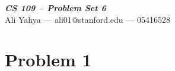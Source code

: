 \documentclass[12pt]{article}
\begin{document}

   \begin{center}
      {\textbf{
         {\textit{
            {\Large{CS 109 -- Problem Set 6}}
         }}
      }}\\[2pt]
      {\large{Ali Yahya --- ali01@stanford.edu --- 05416528}}
   \end{center}


   \section*{Problem 1}
      
\end{document}
